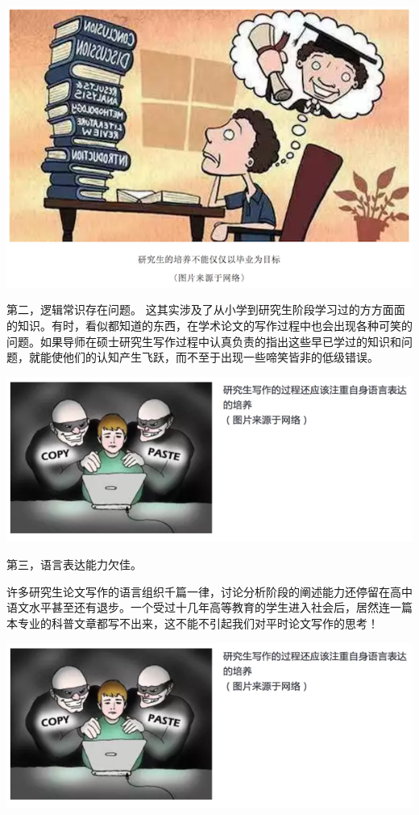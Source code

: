 \documentclass[]{book}
\begin{document}
\includegraphics[width=8.33in]{images/edit3}

第二，逻辑常识存在问题。
这其实涉及了从小学到研究生阶段学习过的方方面面的知识。有时，看似都知道的东西，在学术论文的写作过程中也会出现各种可笑的问题。如果导师在硕士研究生写作过程中认真负责的指出这些早已学过的知识和问题，就能使他们的认知产生飞跃，而不至于出现一些啼笑皆非的低级错误。

\includegraphics[width=8.33in]{images/edit4}

第三，语言表达能力欠佳。

许多研究生论文写作的语言组织千篇一律，讨论分析阶段的阐述能力还停留在高中语文水平甚至还有退步。一个受过十几年高等教育的学生进入社会后，居然连一篇本专业的科普文章都写不出来，这不能不引起我们对平时论文写作的思考！

\includegraphics[width=8.33in]{images/edit5}
\end{document}
